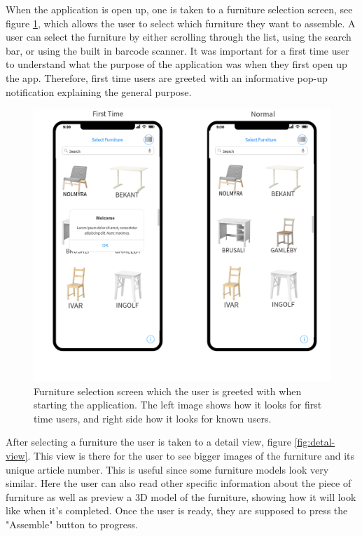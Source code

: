 When the application is open up, one is taken to a furniture selection screen, see figure \ref{fig:furniture-select}, which allows the user to select which furniture they want to assemble. A user can select the furniture by either scrolling through the list, using the search bar, or using the built in barcode scanner. It was important for a first time user to understand what the purpose of the application was when they first open up the app. Therefore, first time users are greeted with an informative pop-up notification explaining the general purpose.
\begin{figure}[!hbt]

\begin{center}
\includegraphics[height = 0.4\textheight]{./Images/Furniture_Select.png}
\caption{Furniture selection screen which the user is greeted with when starting the application. The left image shows how it looks for first time users, and right side how it looks for known users.}
\label{fig:furniture-select}
\end{center}
\end{figure}

After selecting a furniture the user is taken to a detail view, figure \ref{fig:detal-view}. This view is there for the user to see bigger images of the furniture and its unique article number. This is useful since some furniture models look very similar. Here the user can also read other specific information about the piece of furniture as well as preview a 3D model of the furniture, showing how it will look like when it's completed. Once the user is ready, they are supposed to press the "Assemble" button to progress.
 
